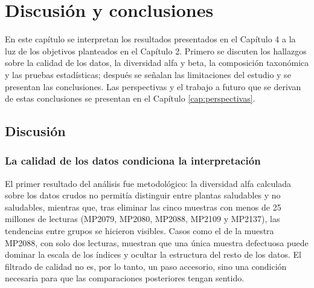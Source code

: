 \chapter{Discusión y conclusiones}
\label{cap:discusion}


En este capítulo se interpretan los resultados presentados en el Capítulo 4 a la luz de los
objetivos planteados en el Capítulo 2. Primero se discuten los hallazgos sobre la calidad de los
datos, la diversidad alfa y beta, la composición taxonómica y las pruebas estadísticas; después se
señalan las limitaciones del estudio y se presentan las conclusiones. Las perspectivas y el trabajo
a futuro que se derivan de estas conclusiones se presentan en el Capítulo \ref{cap:perspectivas}.

\section{Discusión}

\subsection{La calidad de los datos condiciona la interpretación}

El primer resultado del análisis fue metodológico: la diversidad alfa calculada sobre los datos
crudos no permitía distinguir entre plantas saludables y no saludables, mientras que, tras eliminar
las cinco muestras con menos de 25 millones de lecturas (MP2079, MP2080, MP2088, MP2109 y MP2137),
las tendencias entre grupos se hicieron visibles. Casos como el de la muestra MP2088, con solo dos
lecturas, muestran que una única muestra defectuosa puede dominar la escala de los índices y ocultar
la estructura del resto de los datos. El filtrado de calidad no es, por lo tanto, un paso
accesorio, sino una condición necesaria para que las comparaciones posteriores tengan sentido.


